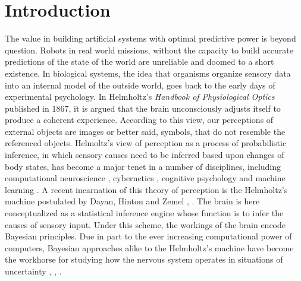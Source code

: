\documentclass[11pt, onecolumn]{article}
\begin{document}
\section{Introduction}
\label{se:intro}
The value in building artificial systems with optimal predictive power is beyond question. Robots in real world missions, without the capacity to build accurate predictions of the state of the world are unreliable and doomed to a short existence. 
In biological systems, the idea that organisms organize sensory data into an internal model of the outside world, goes back to the early days of experimental psychology. In Helmholtz's \emph{Handbook of Physiological Optics} published in 1867, it is argued that the brain unconsciously adjusts itself to produce a coherent experience. According to this view, our perceptions of external objects are images or better said, symbols, that do not resemble the referenced objects.  Helmoltz's view of perception as a process of probabilistic inference, in which sensory causes need to be inferred based upon changes of body states, has become a major tenet in a number of disciplines, including computational neuroscience \citep{Dayan:2002}, cybernetics \citep{ashby_introduction_2015}, cognitive psychology \citep{neisser_cognitive_2014} and machine learning \citep{neal_view_1998}.
A recent incarnation of this theory of perception is the Helmholtz's machine postulated by Dayan, Hinton and Zemel \citep{dayan_helmholtz_1995}, \citep{dayan_varieties_1996}. The brain is here conceptualized as a statistical inference engine whose function is to infer the causes of sensory input. 
Under this scheme, the workings of the brain encode Bayesian principles. Due in part to the ever increasing computational power of computers, Bayesian approaches alike to the Helmholtz's machine have become the workhorse for studying how the nervous system operates in situations of uncertainty \citep{rao_predictive_1999}, \citep{knill_bayesian_2004}, \citep{friston_history_2012}. 


\end{document}

